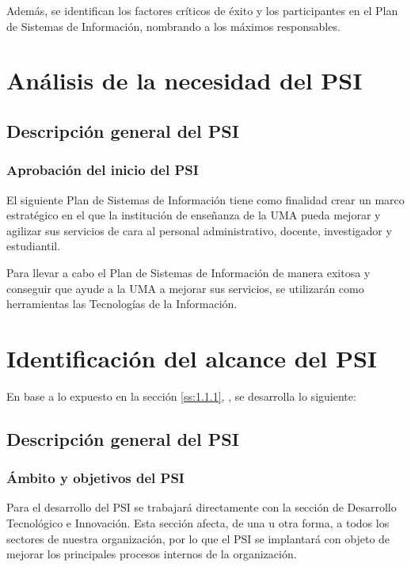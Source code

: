\documentclass[11pt,a4paper,spanish,twoside]{report}
\begin{document}
Además, se identifican los factores críticos de éxito y los participantes en
el Plan de Sistemas de Información, nombrando a los máximos responsables.

\section{Análisis de la necesidad del PSI}
\subsection{Descripción general del PSI}\label{ss:1.1.1}
\subsubsection{Aprobación del inicio del PSI}
El siguiente Plan de Sistemas de Información tiene como finalidad crear un 
marco estratégico en el que la institución de enseñanza de la UMA pueda
mejorar y agilizar sus servicios de cara al personal administrativo, docente, 
investigador y estudiantil.

Para llevar a cabo el Plan de Sistemas de Información de manera exitosa y 
conseguir que ayude a la UMA a mejorar sus servicios, se utilizarán como 
herramientas las Tecnologías de la Información.

\section{Identificación del alcance del PSI}
En base a lo expuesto en la sección \vref{ss:1.1.1}, \emph{},
se desarrolla lo siguiente:

\subsection{Descripción general del PSI}\label{ss:1.2.1}
\subsubsection{Ámbito y objetivos del PSI}
Para el desarrollo del PSI se trabajará directamente con la sección de 
Desarrollo Tecnológico e Innovación. Esta sección afecta, de una u otra
forma, a todos los sectores de nuestra organización, por lo que el PSI se
implantará con objeto de mejorar los principales procesos internos de la
organización.
\end{document}
